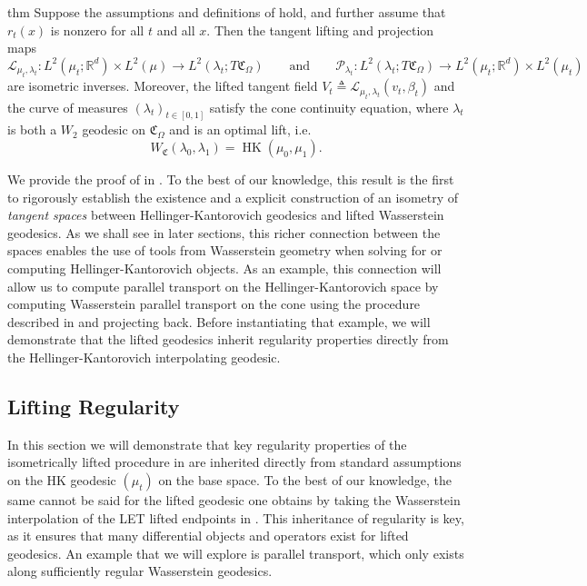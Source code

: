 \documentclass[11pt]{article}
\newcommand{\HK}{\operatorname{HK}}
\begin{document}
\begin{restatable}{thm}{} \label{lifting by characteristics two}
    Suppose the assumptions and definitions of  hold, and further assume that $r_t(x)$ is nonzero for all $t$ and all $x$. Then the tangent lifting and projection maps \[\mathcal{L}_{\mu_t, \lambda_t}: L^2(\mu_t; \mathbb{R}^d) \times L^2(\mu) \rightarrow L^2(\lambda_t; T\mathfrak{C}_\Omega) \qquad \text{and} \qquad \mathcal{P}_{\lambda_t}: L^2(\lambda_t; T\mathfrak{C}_\Omega) \rightarrow L^2(\mu_t; \mathbb{R}^d) \times L^2(\mu_t)\] are isometric inverses. Moreover, the lifted tangent field $V_t \triangleq \mathcal{L}_{\mu_t, \lambda_t}(v_t, \beta_t)$ and the curve of measures $(\lambda_t)_{t \in [0,1]}$ satisfy the cone continuity equation, where $\lambda_t$ is both a $W_2$ geodesic on $\mathfrak{C}_\Omega$ and is an optimal lift, i.e.
    \[W_\mathfrak{C}(\lambda_0, \lambda_1) = \HK(\mu_0, \mu_1).\] 
\end{restatable}
We provide the proof of  in . To the best of our knowledge, this result is the first to rigorously establish the existence and a explicit construction of an isometry of \textit{tangent spaces} between Hellinger-Kantorovich geodesics and lifted Wasserstein geodesics. As we shall see in later sections, this richer connection between the spaces enables the use of tools from Wasserstein geometry when solving for or computing Hellinger-Kantorovich objects. As an example, this connection will allow us to compute parallel transport on the Hellinger-Kantorovich space by computing Wasserstein parallel transport on the cone using the procedure described in \citet{saidi2026wassersteinparalleltransportpredicting} and projecting back. Before instantiating that example, we will demonstrate that the lifted geodesics inherit regularity properties directly from the Hellinger-Kantorovich interpolating geodesic. 


\subsection{Lifting Regularity}

In this section we will demonstrate that key regularity properties of the isometrically lifted procedure in  are inherited directly from standard assumptions on the HK geodesic $(\mu_t)$ on the base space. To the best of our knowledge, the same cannot be said for the lifted geodesic one obtains by taking the Wasserstein interpolation of the LET lifted endpoints in . This inheritance of regularity is key, as it ensures that many differential objects and operators exist for lifted geodesics. An example that we will explore is parallel transport, which only exists along sufficiently regular Wasserstein geodesics. 
\end{document}
